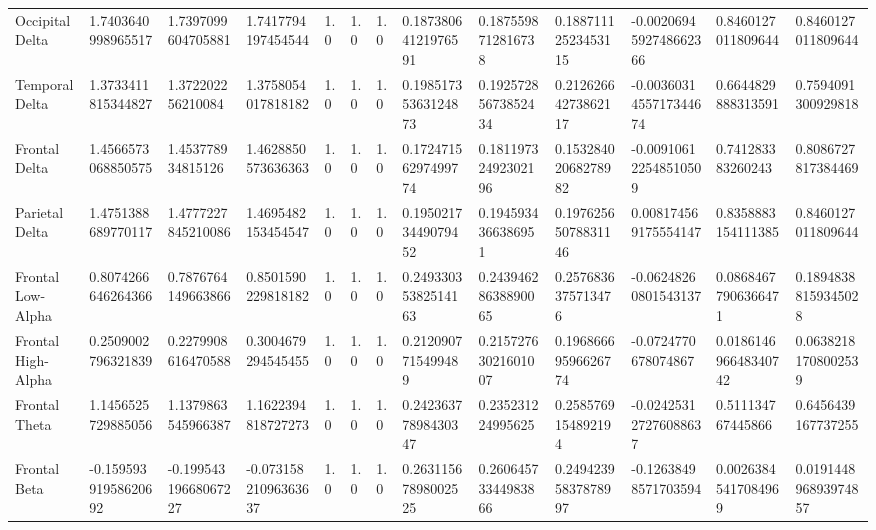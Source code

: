 \begin{longtable}{lllllllllllll}
\bottomrule
\endlastfoot
Occipital Delta      &    1.7403640998965517 &    1.7397099604705881 &     1.7417794197454544 &      1.0 &              1.0 &                1.0 &  0.18738064121976591 &   0.1875598712816738 &  0.18871112523453115 &  -0.0020694592748662366 &      0.8460127011809644 &    0.8460127011809644 \\
Temporal Delta       &    1.3733411815344827 &     1.372202256210084 &     1.3758054017818182 &      1.0 &              1.0 &                1.0 &  0.19851735363124873 &  0.19257285673852434 &  0.21262664273862117 &  -0.0036031455717344674 &      0.6644829888313591 &    0.7594091300929818 \\
Frontal Delta        &    1.4566573068850575 &     1.453778934815126 &     1.4628850573636363 &      1.0 &              1.0 &                1.0 &  0.17247156297499774 &  0.18119732492302196 &  0.15328402068278982 &   -0.009106122548510509 &       0.741283383260243 &    0.8086727817384469 \\
Parietal Delta       &    1.4751388689770117 &    1.4777227845210086 &     1.4695482153454547 &      1.0 &              1.0 &                1.0 &  0.19502173449079452 &   0.1945934366386951 &  0.19762565078831146 &    0.008174569175554147 &      0.8358883154111385 &    0.8460127011809644 \\
Frontal Low-Alpha    &    0.8074266646264366 &    0.7876764149663866 &     0.8501590229818182 &      1.0 &              1.0 &                1.0 &  0.24933035382514163 &  0.24394628638890065 &   0.2576836375713476 &    -0.06248260801543137 &     0.08684677906366471 &   0.18948388159345028 \\
Frontal High-Alpha   &    0.2509002796321839 &    0.2279908616470588 &     0.3004679294545455 &      1.0 &              1.0 &                1.0 &   0.2120907715499489 &  0.21572763021601007 &  0.19686669596626774 &     -0.0724770678074867 &    0.018614696648340742 &   0.06382181708002539 \\
Frontal Theta        &    1.1456525729885056 &    1.1379863545966387 &     1.1622394818727273 &      1.0 &              1.0 &                1.0 &  0.24236377898430347 &    0.235231224995625 &   0.2585769154892194 &   -0.024253127276088637 &       0.511134767445866 &    0.6456439167737255 \\
Frontal Beta         &  -0.15959391958620692 &  -0.19954319668067227 &   -0.07315821096363637 &      1.0 &              1.0 &                1.0 &  0.26311567898002525 &  0.26064573344983866 &  0.24942395837878997 &    -0.12638498571703594 &     0.00263845417084969 &  0.019144896893974857 \\

\end{longtable}
